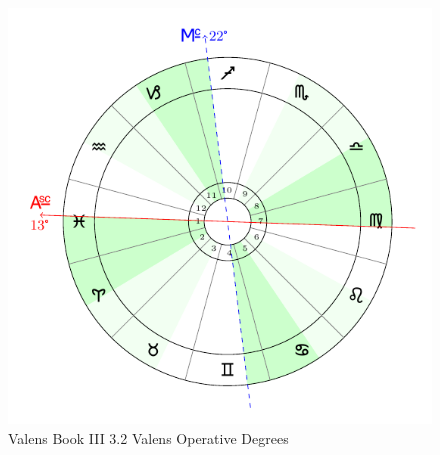 \begin{figure}[H]
\includegraphics[width=\textwidth]{charts/3_02_Valens_opdegs}
\caption{Valens Book III 3.2 Valens Operative Degrees}
\end{figure}

